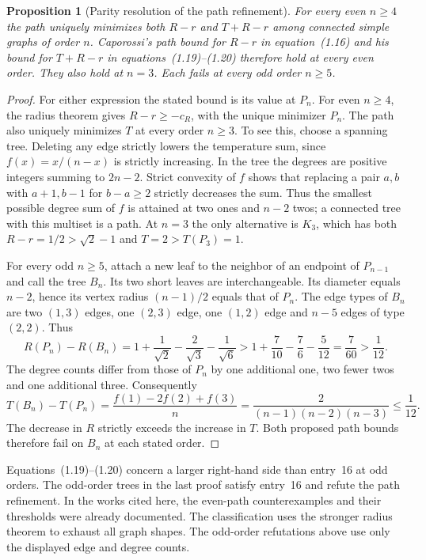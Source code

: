\documentclass[11pt,a4paper]{article}
\newtheorem{proposition}[theorem]{Proposition}
\begin{document}
\begin{proposition}[Parity resolution of the path refinement]\label{prop:cat-temp}
For every even $n\ge4$ the path uniquely minimizes both $R-r$ and
$T+R-r$ among connected simple graphs of order $n$. Caporossi's
path bound for $R-r$ in equation~(1.16) and his bound for $T+R-r$
in equations~(1.19)--(1.20) therefore hold at every even order.
They also hold at $n=3$. Each fails at every odd order $n\ge5$.
\end{proposition}
\begin{proof}
For either expression the stated bound is its value at $P_n$.
For even $n\ge4$, the radius theorem gives $R-r\ge-c_R$, with the
unique minimizer $P_n$. The path also uniquely minimizes $T$ at every
order $n\ge3$. To see this, choose a spanning tree. Deleting any edge
strictly lowers the temperature sum, since $f(x)=x/(n-x)$ is strictly
increasing. In the tree the degrees are positive integers summing to
$2n-2$. Strict convexity of $f$ shows that replacing a pair $a,b$ with
$a+1,b-1$ for $b-a\ge2$ strictly decreases the sum. Thus the smallest
possible degree sum of $f$ is attained at two ones and $n-2$ twos;
a connected tree with this multiset is a path. At $n=3$ the only
alternative is $K_3$, which has both $R-r=1/2>\sqrt2-1$ and
$T=2>T(P_3)=1$.

For every odd $n\ge5$, attach a new leaf to the neighbor of an endpoint
of $P_{n-1}$ and call the tree $B_n$. Its two short leaves are
interchangeable. Its diameter equals $n-2$, hence its vertex radius
$(n-1)/2$ equals that of $P_n$. The edge types of $B_n$ are two
$(1,3)$ edges, one $(2,3)$ edge, one $(1,2)$ edge and $n-5$ edges
of type $(2,2)$. Thus
\[
 R(P_n)-R(B_n)=1+\frac1{\sqrt2}-\frac2{\sqrt3}-\frac1{\sqrt6}
 >1+\frac7{10}-\frac76-\frac5{12}=\frac7{60}>\frac1{12}.
\]
The degree counts differ from those of $P_n$ by one additional one,
two fewer twos and one additional three. Consequently
\[
 T(B_n)-T(P_n)=\frac{f(1)-2f(2)+f(3)}n
   =\frac{2}{(n-1)(n-2)(n-3)}\le\frac1{12}.
\]
The decrease in $R$ strictly exceeds the increase in $T$. Both
proposed path bounds therefore fail on $B_n$ at each stated order.
\end{proof}

Equations~(1.19)--(1.20) concern a larger right-hand side than entry~16
at odd orders. The odd-order trees in the last proof satisfy entry~16
and refute the path refinement. In the works cited here, the even-path
counterexamples and their thresholds were already documented. The
classification uses the stronger radius theorem to exhaust all graph
shapes. The odd-order refutations above use only the displayed edge and
degree counts.
\end{document}
